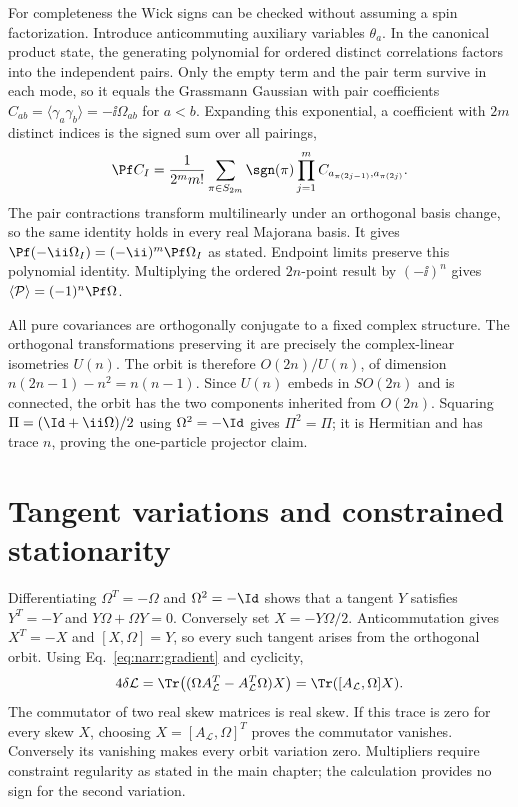 For completeness the Wick signs can be checked without assuming a spin
factorization. Introduce anticommuting auxiliary variables $\theta_a$. In the
canonical product state, the generating polynomial for ordered distinct
correlations factors into the independent pairs. Only the empty term and the
pair term survive in each mode, so it equals the Grassmann Gaussian with
pair coefficients $C_{ab}=\langle\gamma_a\gamma_b\rangle=-\ii\Omega_{ab}$ for
$a<b$. Expanding this exponential, a coefficient with $2m$ distinct indices
is the signed sum over all pairings,
\begin{equation}
 \Pf C_I=\frac{1}{2^m m!}\sum_{\pi\in S_{2m}}\sgn(\pi)
             \prod_{j=1}^m C_{a_{\pi(2j-1)},a_{\pi(2j)}}.
\end{equation}
The pair contractions transform multilinearly under an orthogonal basis
change, so the same identity holds in every real Majorana basis. It gives
$\Pf(-\ii\Omega_I)=(-\ii)^m\Pf\Omega_I$ as stated. Endpoint limits preserve
this polynomial identity. Multiplying the ordered $2n$-point result by
$(-\ii)^n$ gives $\langle\mathcal P\rangle=(-1)^n\Pf\Omega$.

All pure covariances are orthogonally conjugate to a fixed complex structure.
The orthogonal transformations preserving it are precisely the complex-linear
isometries $U(n)$. The orbit is therefore $O(2n)/U(n)$, of dimension
$n(2n-1)-n^2=n(n-1)$. Since $U(n)$ embeds in $SO(2n)$ and is connected, the
orbit has the two components inherited from $O(2n)$. Squaring
$\Pi=(\Id+\ii\Omega)/2$ using $\Omega^2=-\Id$ gives $\Pi^2=\Pi$; it is
Hermitian and has trace $n$, proving the one-particle projector claim.

\section{Tangent variations and constrained stationarity}
\label{app:stationarity_proof}
Differentiating $\Omega^T=-\Omega$ and $\Omega^2=-\Id$ shows that a tangent
$Y$ satisfies $Y^T=-Y$ and $Y\Omega+\Omega Y=0$. Conversely set
$X=-Y\Omega/2$. Anticommutation gives $X^T=-X$ and
$[X,\Omega]=Y$, so every such tangent arises from the orthogonal orbit.
Using Eq.~\eqref{eq:narr:gradient} and cyclicity,
\begin{equation}
 4\delta\mathcal L=\Tr\bigl((\Omega A_{\mathcal L}^T
                  -A_{\mathcal L}^T\Omega)X\bigr)
             =\Tr([A_{\mathcal L},\Omega]X).
\end{equation}
The commutator of two real skew matrices is real skew. If this trace is zero
for every skew $X$, choosing $X=[A_{\mathcal L},\Omega]^T$ proves the
commutator vanishes. Conversely its vanishing makes every orbit variation
zero. Multipliers require constraint regularity as stated in the main chapter;
the calculation provides no sign for the second variation.

